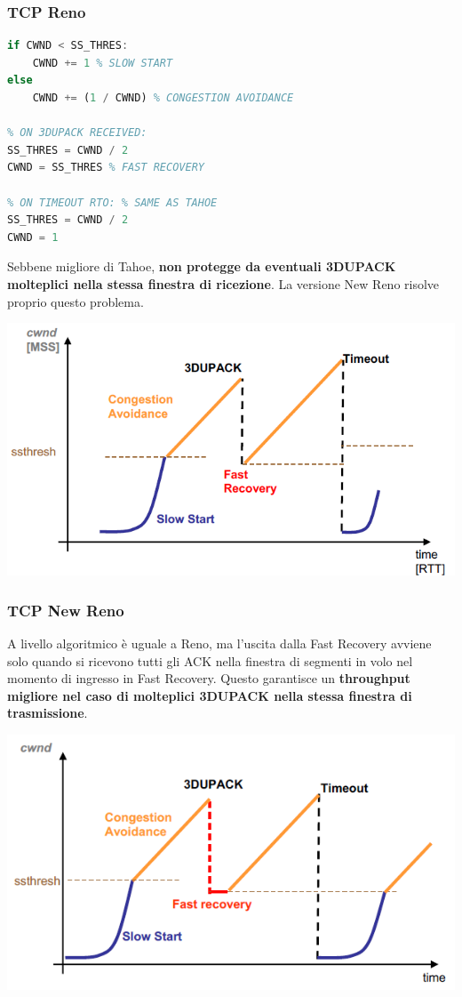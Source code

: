 \documentclass[12pt]{article}
\begin{document}
\subsubsection{TCP Reno}

\begin{lstlisting}[language=Octave]
% ON ACK RECEIVED:
if CWND < SS_THRES:
    CWND += 1 % SLOW START
else
    CWND += (1 / CWND) % CONGESTION AVOIDANCE

% ON 3DUPACK RECEIVED:
SS_THRES = CWND / 2
CWND = SS_THRES % FAST RECOVERY

% ON TIMEOUT RTO: % SAME AS TAHOE
SS_THRES = CWND / 2
CWND = 1
\end{lstlisting}
Sebbene migliore di Tahoe,\textbf{ non protegge da eventuali 3DUPACK molteplici nella stessa finestra di ricezione}. La versione New Reno risolve proprio questo problema.

\begin{center}
    \includegraphics[scale=0.5]{tcp_reno}
\end{center}

\subsubsection{TCP New Reno}

A livello algoritmico è uguale a Reno, ma l'uscita dalla Fast Recovery avviene solo quando si ricevono tutti gli ACK nella finestra di segmenti in volo nel momento di ingresso in Fast Recovery. Questo garantisce un \textbf{throughput migliore nel caso di molteplici 3DUPACK nella stessa finestra di trasmissione}.

\begin{center}
    \includegraphics[scale=0.75]{tcp_new_reno}
\end{center}
\end{document}
